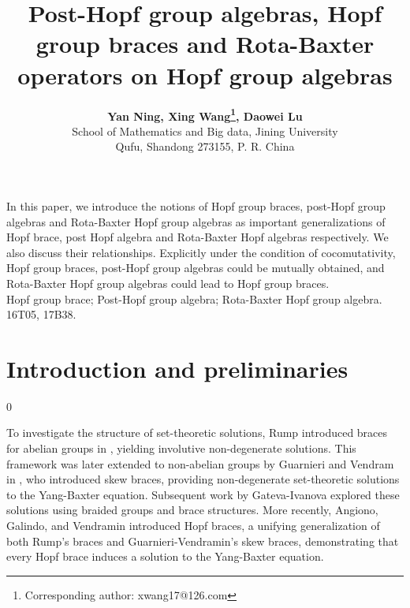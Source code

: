 \documentclass[11pt]{article}
\date{}
\begin{document}
\renewcommand{\baselinestretch}{1.2}
\renewcommand{\arraystretch}{1.0}
\title{\bf  Post-Hopf group algebras, Hopf group braces and Rota-Baxter operators on Hopf group algebras}

\author {{\bf Yan Ning, Xing Wang\footnote {Corresponding author: xwang17@126.com}, Daowei Lu}\\
{\small School of Mathematics and Big data, Jining University}\\
{\small Qufu, Shandong 273155, P. R. China}
}
 \maketitle

\begin{center}
\begin{minipage}{12.cm}

 In this paper, we introduce the notions of Hopf group braces, post-Hopf group algebras and Rota-Baxter Hopf group algebras as important generalizations of Hopf brace, post Hopf algebra and Rota-Baxter Hopf algebras respectively. We also discuss their relationships. Explicitly under the condition of cocomutativity, Hopf group braces, post-Hopf group algebras could be mutually obtained, and Rota-Baxter Hopf group algebras could lead to Hopf group braces.
\\

 Hopf group brace; Post-Hopf group algebra; Rota-Baxter Hopf group algebra.
\\

  16T05, 17B38.
\end{minipage}
\end{center}
\normalsize\vskip1cm
 

\section{Introduction and preliminaries}
\def\theequation{1.\arabic{equation}}
\setcounter{equation} {0}


To investigate the structure of set-theoretic solutions, Rump introduced braces for abelian groups in \cite{R} , yielding involutive non-degenerate solutions. This framework was later extended to non-abelian groups by Guarnieri and Vendram in \cite{Gua}, who introduced skew braces, providing non-degenerate set-theoretic solutions to the Yang-Baxter equation. Subsequent work by Gateva-Ivanova \cite{Ga} explored these solutions using braided groups and brace structures. More recently, Angiono, Galindo, and Vendramin \cite{AGV} introduced Hopf braces, a unifying generalization of both Rump’s braces and Guarnieri-Vendramin’s skew braces, demonstrating that every Hopf brace induces a solution to the Yang-Baxter equation.
\end{document}
